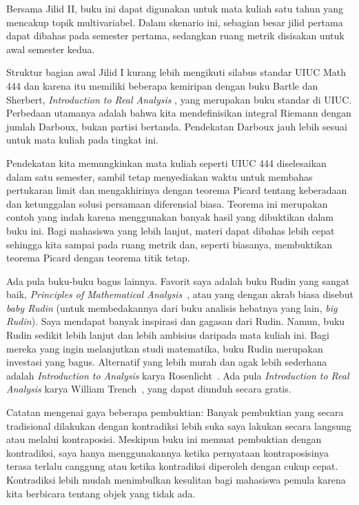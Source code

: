 Bersama Jilid II\@, buku ini dapat digunakan untuk mata kuliah satu tahun yang
mencakup topik multivariabel. Dalam skenario ini, sebagian besar jilid pertama
dapat dibahas pada semester pertama, sedangkan ruang metrik disisakan untuk
awal semester kedua.

Struktur bagian awal Jilid I kurang lebih mengikuti silabus standar UIUC Math
444 dan karena itu memiliki beberapa kemiripan dengan buku Bartle dan Sherbert,
\emph{Introduction to Real Analysis} \cite{BS}, yang merupakan buku standar di
UIUC\@.
Perbedaan utamanya adalah bahwa kita mendefinisikan integral Riemann dengan
jumlah Darboux, bukan partisi bertanda. Pendekatan Darboux jauh lebih sesuai
untuk mata kuliah pada tingkat ini.

Pendekatan kita memungkinkan mata kuliah seperti UIUC 444 diselesaikan dalam
satu semester, sambil tetap menyediakan waktu untuk membahas pertukaran limit
dan mengakhirinya dengan teorema Picard tentang keberadaan dan ketunggalan
solusi persamaan diferensial biasa.
Teorema ini merupakan contoh yang indah karena menggunakan banyak hasil yang
dibuktikan dalam buku ini. Bagi mahasiswa yang lebih lanjut, materi dapat
dibahas lebih cepat sehingga kita sampai pada ruang metrik dan, seperti
biasanya, membuktikan teorema Picard dengan teorema titik tetap.

Ada pula buku-buku bagus lainnya. Favorit saya adalah buku Rudin yang sangat
baik, \emph{Principles of Mathematical Analysis}~\cite{Rudin:baby}, atau yang
dengan akrab biasa disebut \emph{baby Rudin} (untuk membedakannya dari buku
analisis hebatnya yang lain, \emph{big Rudin}). Saya mendapat banyak inspirasi
dan gagasan dari Rudin. Namun, buku Rudin sedikit lebih lanjut dan lebih
ambisius daripada mata kuliah ini.
Bagi mereka yang ingin melanjutkan studi matematika, buku Rudin merupakan
investasi yang bagus.
Alternatif yang lebih murah dan agak lebih sederhana adalah
\emph{Introduction to Analysis} karya Rosenlicht~\cite{Rosenlicht}.
Ada pula \emph{Introduction to Real Analysis} karya William
Trench~\cite{Trench}, yang dapat diunduh secara gratis.

\medskip

Catatan mengenai gaya beberapa pembuktian: Banyak pembuktian yang secara
tradisional dilakukan dengan kontradiksi lebih suka saya lakukan secara
langsung atau melalui kontraposisi. Meskipun buku ini memuat pembuktian dengan
kontradiksi, saya hanya menggunakannya ketika pernyataan kontraposisinya terasa
terlalu canggung atau ketika kontradiksi diperoleh dengan cukup cepat.
Kontradiksi lebih mudah menimbulkan kesulitan bagi mahasiswa pemula karena kita
berbicara tentang objek yang tidak ada.

